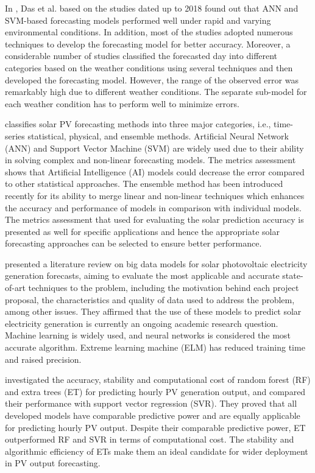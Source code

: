 In \cite{DAS2018912}, Das et al. based on the studies dated up to 2018 found out that ANN and SVM-based forecasting models performed well under rapid and varying environmental conditions.
In addition, most of the studies adopted numerous techniques to develop the forecasting model for better accuracy.
Moreover, a considerable number of studies classified the forecasted day into different categories based on the weather conditions using several techniques and then developed the forecasting model.
However, the range of the observed error was remarkably high due to different weather conditions.
The separate sub-model for each weather condition has to perform well to minimize errors.

\cite{SOBRI2018459} classifies solar PV forecasting methods into three major categories, i.e., time-series statistical, physical, and ensemble methods.
Artificial Neural Network (ANN) and Support Vector Machine (SVM) are widely used due to their ability in solving complex and non-linear forecasting models.
The metrics assessment shows that Artificial Intelligence (AI) models could decrease the error compared to other statistical approaches.
The ensemble method has been introduced recently for its ability to merge linear and non-linear techniques which enhances the accuracy and performance of models in comparison with individual models.
The metrics assessment that used for evaluating the solar prediction accuracy is presented as well for specific applications and hence the appropriate solar forecasting approaches can be selected to ensure better performance.

\cite{DEFREITASVISCONDI201954} presented a literature review on big data models for solar photovoltaic electricity generation forecasts, aiming to evaluate the most applicable and accurate state-of-art techniques to the problem, including the motivation behind each project proposal, the characteristics and quality of data used to address the problem, among other issues.
They affirmed that the use of these models to predict solar electricity generation is currently an ongoing academic research question.
Machine learning is widely used, and neural networks is considered the most accurate algorithm.
Extreme learning machine (ELM) has reduced training time and raised precision.

\cite{AHMAD2018465} investigated the accuracy, stability and computational cost of random forest (RF) and extra trees (ET) for predicting hourly PV generation output, and compared their performance with support vector regression (SVR).
They proved that all developed models have comparable predictive power and are equally applicable for predicting hourly PV output.
Despite their comparable predictive power, ET outperformed RF and SVR in terms of computational cost.
The stability and algorithmic efficiency of ETs make them an ideal candidate for wider deployment in PV output forecasting.

